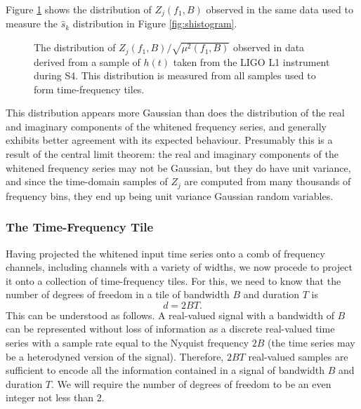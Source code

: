 \documentclass{article}
\begin{document}
Figure \ref{fig:Zhistogram} shows the distribution of \(Z_{j}(f_{1}, B)\)
observed in the same data used to measure the \(\hat{s}_{k}\) distribution
in Figure \ref{fig:shistogram}.
\begin{figure}
\begin{center}
\end{center}
\caption{The distribution of \(Z_{j}(f_{1}, B) / \sqrt{\mu^{2}(f_{1}, B)}\)
observed in data derived from a sample of \(h(t)\) taken from the LIGO L1
instrument during S4.  This distribution is measured from all samples used
to form time-frequency tiles.}
\label{fig:Zhistogram}
\end{figure}
This distribution appears more Gaussian than does the distribution of the
real and imaginary components of the whitened frequency series, and
generally exhibits better agreement with its expected behaviour.
Presumably this is a result of the central limit theorem:  the real and
imaginary components of the whitened frequency series may not be Gaussian,
but they do have unit variance, and since the time-domain samples of
\(Z_{j}\) are computed from many thousands of frequency bins, they end up
being unit variance Gaussian random variables.


\subsubsection{The Time-Frequency Tile}


Having projected the whitened input time series onto a comb of frequency
channels, including channels with a variety of widths, we now procede to
project it onto a collection of time-frequency tiles.  For this, we need to
know that the number of degrees of freedom in a tile of bandwidth \(B\) and
duration \(T\) is
\begin{equation}
d
   = 2 B T.
\end{equation}
This can be understood as follows.  A real-valued signal with a bandwidth
of \(B\) can be represented without loss of information as a discrete
real-valued time series with a sample rate equal to the Nyquist frequency
\(2 B\) (the time series may be a heterodyned version of the signal).
Therefore, \(2 B T\) real-valued samples are sufficient to encode all the
information contained in a signal of bandwidth \(B\) and duration \(T\).
We will require the number of degrees of freedom to be an even integer not
less than 2.
\end{document}
